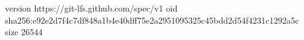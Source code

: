 version https://git-lfs.github.com/spec/v1
oid sha256:e92e2d7f4c7df848a1b4e40dff75e2a2951095325c45bdd2d54f4231c1292a5c
size 26544
